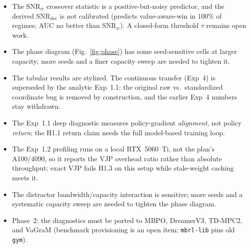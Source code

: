 \documentclass[11pt]{article}
\begin{document}
\begin{itemize}
\item The $\mathrm{SNR}_w$ crossover statistic is a positive-but-noisy predictor, and
  the derived $\mathrm{SNR}_{\mathrm{dec}}$ is not calibrated (predicts value-aware-win
  in $100\%$ of regimes; AUC no better than $\mathrm{SNR}_w$). A closed-form threshold
  $\tau$ remains open work.
\item The phase diagram (Fig.~\ref{fig:phase}) has some seed-sensitive cells at larger
  capacity; more seeds and a finer capacity sweep are needed to tighten it.
\item The tabular results are stylized. The continuous transfer (Exp~4) is superseded by
  the analytic Exp~1.1; the original raw vs.\ standardized coordinate bug is removed by
  construction, and the earlier Exp~4 numbers stay withdrawn.
\item The Exp~1.1 deep diagnostic measures policy-gradient \emph{alignment}, not policy
  \emph{return}; the H1.1 return claim needs the full model-based training loop.
\item The Exp~1.2 profiling runs on a local RTX~5060~Ti, not the plan's A100/4090, so it
  reports the VJP overhead ratio rather than absolute throughput; exact VJP fails H1.3 on
  this setup while stale-weight caching meets it.
\item The distractor bandwidth/capacity interaction is sensitive; more seeds and a
  systematic capacity sweep are needed to tighten the phase diagram.
\item Phase~2: the diagnostics must be ported to MBPO, DreamerV3, TD-MPC2, and VaGraM
  (benchmark provisioning is an open item; \texttt{mbrl-lib} pins old \texttt{gym}).
\end{itemize}
\end{document}
